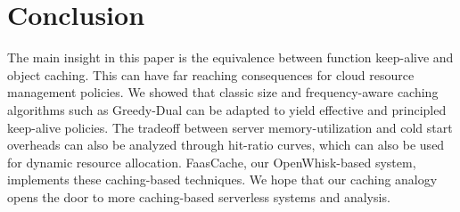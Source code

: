 \section{Conclusion}

The main insight in this paper is the equivalence between function keep-alive and object caching.
This can have far reaching consequences for cloud resource management policies.
We showed that classic size and frequency-aware caching algorithms such as Greedy-Dual can be adapted to yield effective and principled keep-alive policies.
The tradeoff between server memory-utilization and cold start overheads can also be analyzed through hit-ratio curves, which can also be used for dynamic resource allocation.
FaasCache, our OpenWhisk-based system, implements these caching-based techniques.
We hope that our caching analogy opens the door to more caching-based serverless systems and analysis. 


